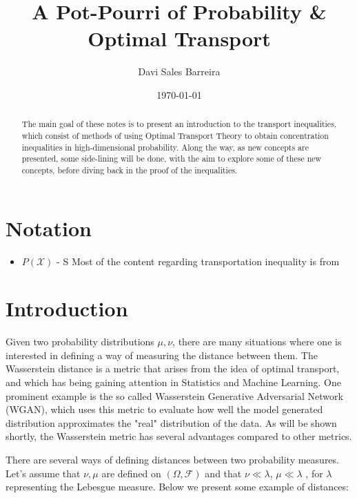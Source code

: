 \documentclass[10pt]{article}
\title{A Pot-Pourri of Probability \& Optimal Transport}
\author{Davi Sales Barreira}
\date{\today}
\begin{document}
\maketitle \tableofcontents 


\begin{abstract}
The main goal of these notes is to present an introduction to the transport inequalities,
which consist of methods of using Optimal Transport Theory to obtain concentration
inequalities in high-dimensional probability. Along the way, as new concepts are presented,
some side-lining will be done, with the aim to explore some of these new concepts, before
diving back in the proof of the inequalities.
\end{abstract}

\section*{Notation}
\begin{itemize}
	\item $P(\mathcal X)$ - S
	Most of the content regarding transportation inequality is from

\end{itemize}
\section{Introduction}
Given two probability distributions $\mu,\nu$, there are many situations
where one is interested in defining a way of measuring the
distance between them. The Wasserstein distance is a
metric that arises from the idea of optimal transport, and which has being
gaining attention in Statistics and Machine Learning. One prominent example is the so
called Wasserstein Generative Adversarial Network (WGAN), which uses this metric to evaluate
how well the model generated distribution approximates the "real" distribution of the
data. As will be shown shortly, the Wasserstein metric has several advantages compared to
other metrics.

There are several ways of defining distances between two
probability measures. Let's assume that $\nu, \mu$ are defined on 
$(\Omega, \mathcal F)$ and that $\nu \ll \lambda$,
$\mu \ll \lambda$ , for $\lambda$ representing the Lebesgue measure. Below
we present some example of distances:
\end{document}
